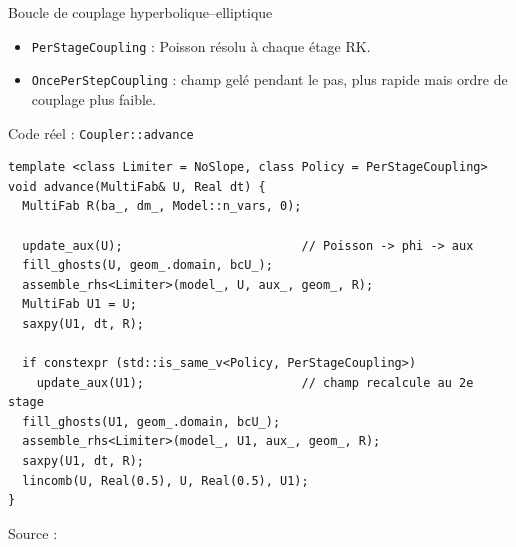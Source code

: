 \documentclass[10pt,aspectratio=169]{beamer}
\newcommand{\code}[1]{\texttt{\footnotesize #1}}
\newcommand{\src}[1]{{\scriptsize\color{adcGray}Source : \texttt{\footnotesize\detokenize{#1}}}}
\begin{document}
\begin{frame}{Boucle de couplage hyperbolique--elliptique}
  \begin{center}
  \end{center}

  \vspace{0.2cm}
  \begin{itemize}
    \item \code{PerStageCoupling} : Poisson résolu à chaque étage RK.
    \item \code{OncePerStepCoupling} : champ gelé pendant le pas, plus rapide mais ordre de couplage plus faible.
  \end{itemize}
\end{frame}

\begin{frame}[fragile]{Code réel : \texttt{Coupler::advance}}
\begin{lstlisting}[style=cppslide]
template <class Limiter = NoSlope, class Policy = PerStageCoupling>
void advance(MultiFab& U, Real dt) {
  MultiFab R(ba_, dm_, Model::n_vars, 0);

  update_aux(U);                         // Poisson -> phi -> aux
  fill_ghosts(U, geom_.domain, bcU_);
  assemble_rhs<Limiter>(model_, U, aux_, geom_, R);
  MultiFab U1 = U;
  saxpy(U1, dt, R);

  if constexpr (std::is_same_v<Policy, PerStageCoupling>)
    update_aux(U1);                      // champ recalcule au 2e stage
  fill_ghosts(U1, geom_.domain, bcU_);
  assemble_rhs<Limiter>(model_, U1, aux_, geom_, R);
  saxpy(U1, dt, R);
  lincomb(U, Real(0.5), U, Real(0.5), U1);
}
\end{lstlisting}
  \src{include/adc/coupling/coupler.hpp}
\end{frame}
\end{document}
